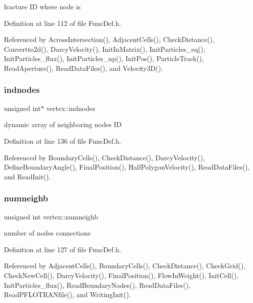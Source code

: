 fracture ID where node is 

Definition at line 112 of file Func\+Def.\+h.



Referenced by Across\+Intersection(), Adjacent\+Cells(), Check\+Distance(), Convertto2d(), Darcy\+Velocity(), Init\+In\+Matrix(), Init\+Particles\+\_\+eq(), Init\+Particles\+\_\+flux(), Init\+Particles\+\_\+np(), Init\+Pos(), Particle\+Track(), Read\+Aperture(), Read\+Data\+Files(), and Velocity3\+D().

\mbox{\label{structvertex_a82e41673a29352ee0f004ae7890d5266}} 
\subsubsection{\texorpdfstring{indnodes}{indnodes}}
{\footnotesize\ttfamily unsigned int$\ast$ vertex\+::indnodes}

dynamic array of neighboring nodes ID 

Definition at line 136 of file Func\+Def.\+h.



Referenced by Boundary\+Cells(), Check\+Distance(), Darcy\+Velocity(), Define\+Boundary\+Angle(), Final\+Position(), Half\+Polygon\+Velocity(), Read\+Data\+Files(), and Read\+Init().

\mbox{\label{structvertex_acf83b561551952403148f73fe032f57b}} 
\subsubsection{\texorpdfstring{numneighb}{numneighb}}
{\footnotesize\ttfamily unsigned int vertex\+::numneighb}

number of nodes connections 

Definition at line 127 of file Func\+Def.\+h.



Referenced by Adjacent\+Cells(), Boundary\+Cells(), Check\+Distance(), Check\+Grid(), Check\+New\+Cell(), Darcy\+Velocity(), Final\+Position(), Flow\+In\+Weight(), Init\+Cell(), Init\+Particles\+\_\+flux(), Read\+Boundary\+Nodes(), Read\+Data\+Files(), Read\+P\+F\+L\+O\+T\+R\+A\+Nfile(), and Writing\+Init().

\mbox{\label{structvertex_a54ac97be271319fa385aef0685ea0641}} 
